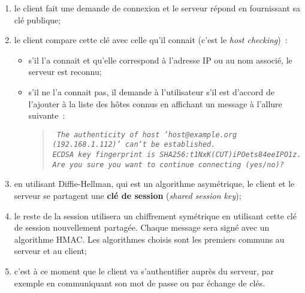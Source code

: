 \documentclass[a4paper,11pt]{article}
\begin{document}
\begin{enumerate}
	
	\item le client fait une demande de connexion et le serveur répond en
		fournissant sa clé publique;
	\item le client compare cette clé avec celle qu'il connait (c'est le
		\textit{host checking})~:
		\begin{itemize}			
			\item s'il l'a connait et qu'elle correspond à l'adresse IP ou au
				nom associé, le serveur est reconnu;
			\item s'il ne l'a connait pas, il demande à l'utilisateur s'il est
				d'accord de l'ajouter à la liste des hôtes connus en affichant
				un message à l'allure suivante~:

				\begin{quote}
					\it\tt \small
					The authenticity of host 'host@example.org (192.168.1.112)' 
					can't be established.\\
					ECDSA key fingerprint is SHA256:t1NxK(CUT)iPOets84eeIPO1z.\\
					Are you sure you want to continue connecting (yes/no)? 
				\end{quote}
		\end{itemize}

	\item en utilisant Diffie-Hellman, qui est un algorithme asymétrique, le
		client et le serveur se partagent une \textbf{clé de session}
		(\textit{shared session key});

	\item le reste de la session utilisera un chiffrement symétrique en
		utilisant cette clé de session nouvellement partagée. Chaque message
		sera signé avec un algorithme HMAC.  Les algorithmes choisis sont les
		premiers communs au serveur et au client;

	\item c'est à ce moment que le client va s'authentifier auprès du serveur,
		par exemple en communiquant son mot de passe ou par échange de clés. 

\end{enumerate}
\end{document}
